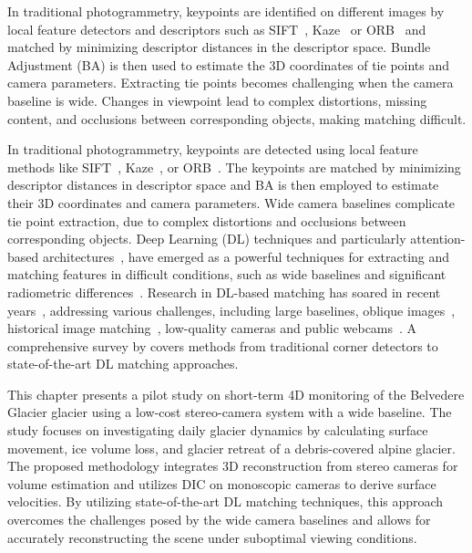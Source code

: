In traditional photogrammetry, keypoints are identified on different images by
local feature detectors and descriptors such as SIFT~\citep{Lowe2004},
Kaze~\citep{Alcantarilla2012} or ORB~\citep{Rublee2011}
and matched by minimizing descriptor distances in the descriptor space.
Bundle Adjustment (BA) is then used to estimate the 3D coordinates of tie points
and camera parameters.
Extracting tie points becomes challenging when the camera baseline is wide.
Changes in viewpoint lead to complex distortions, missing content, and occlusions between
corresponding objects, making
matching difficult.

In traditional photogrammetry, keypoints are detected using local feature methods like
SIFT~\citep{Lowe2004}, Kaze~\citep{Alcantarilla2012}, or ORB~\citep{Rublee2011}. The
keypoints are matched by minimizing descriptor distances in descriptor space and BA is
then employed to estimate their 3D coordinates and camera parameters.
Wide camera baselines complicate tie point extraction, due to complex
distortions and occlusions between corresponding objects.
Deep Learning (DL) techniques and particularly attention-based
architectures~\citep{vaswani2023attention},
have emerged as a powerful techniques for extracting and matching features in difficult
conditions, such as wide baselines and significant radiometric
differences~\citep{jin_image_2021,Yao_2021}.
Research in DL-based matching has soared in recent
years~\citep{Chen_2021_handcrafted_to_DL},
addressing various challenges, including large baselines, oblique
images~\citep{Yao_2021}, historical image matching~\citep{Maiwald2021_Historical},
low-quality cameras and public webcams~\citep{wu2021_public_webcams}.
A comprehensive survey by \cite{remondino2022_at_with_dl} covers methods from
traditional corner detectors to state-of-the-art DL matching
approaches.

This chapter presents a pilot study on short-term 4D monitoring of the Belvedere Glacier glacier using
a low-cost stereo-camera system with a wide baseline. 
The study focuses on investigating daily glacier dynamics by calculating surface movement, ice volume loss, and glacier
retreat of a debris-covered alpine glacier.
The proposed methodology integrates 3D reconstruction from stereo cameras for volume
estimation and utilizes DIC on monoscopic cameras to derive surface velocities.
By utilizing state-of-the-art DL matching techniques, this approach overcomes
the challenges posed by the wide camera baselines and allows for accurately
reconstructing the scene under suboptimal viewing conditions.

